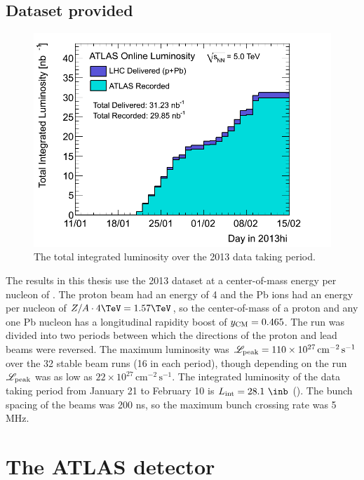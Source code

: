 \subsection{Dataset provided}

\begin{figure}[t]
\includegraphics{sumLumiByDayUrgent.png}
\caption{The total integrated luminosity over the 2013 \pPb data taking period.}
\label{fig:int_lumi}
\end{figure}

The results in this thesis use the 2013 \lhc \pPb dataset at a center-of-mass energy per nucleon of \pPbenergy.
The proton beam had an energy of 4 \TeV and the Pb ions had an energy per nucleon of $Z/A \cdot 4 \TeV = 1.57 \TeV$, so the center-of-mass of a proton and any one Pb nucleon has a longitudinal rapidity boost of $y_{\mathrm{CM}} = 0.465$.
The \pPb run was divided into two periods between which the directions of the proton and lead beams were reversed.
The maximum luminosity was $\mathscr{L}_\textrm{peak} = 110 \times 10^{27} \, \textrm{cm}^{-2} \, \textrm{s}^{-1}$ over the 32 stable beam runs (16 in each period), though depending on the run $\mathscr{L}_\textrm{peak}$ was as low as $22 \times 10^{27} \, \textrm{cm}^{-2} \, \textrm{s}^{-1}$.
The integrated luminosity of the data taking period from January 21 to February 10 is $\Lint = 28.1~\inb$ ().
The bunch spacing of the beams was 200 ns, so the maximum bunch crossing rate was 5 MHz.

\section{The ATLAS detector}
\label{sec:atlas}


